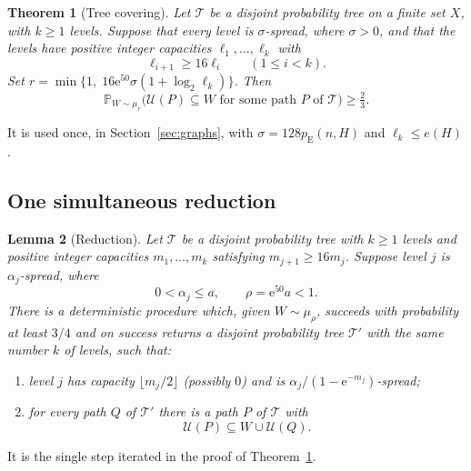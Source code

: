 \documentclass[11pt]{article}
\newtheorem{theorem}{Theorem}[section]
\newtheorem{lemma}[theorem]{Lemma}
\numberwithin{equation}{section}
\newcommand{\PP}{\mathbb P}
\newcommand{\pE}{p_{\mathrm E}}
\newcommand{\TT}{\mathcal T}
\newcommand{\UU}{\mathcal U}
\newcommand{\ee}{\mathrm e}
\begin{document}
\begin{theorem}[Tree covering]\label{thm:tree}
Let $\TT$ be a disjoint probability tree on a finite set $X$, with
$k\ge1$ levels. Suppose that every level is $\sigma$-spread, where
$\sigma>0$, and that the levels have positive integer capacities
$\ell_1,\ldots,\ell_k$ with
\[
 \ell_{i+1}\ge16\ell_i\qquad(1\le i<k).
\]
Set $r=\min\{1,\;16\ee^{50}\sigma(1+\log_2\ell_k)\}$. Then
\[
 \PP_{W\sim\mu_r}
 \bigl(\UU(P)\subseteq W\text{ for some path }P\text{ of }\TT\bigr)
 \ge\tfrac23.
\]
\end{theorem}

It is used once, in Section~\ref{sec:graphs}, with $\sigma=128\pE(n,H)$
and $\ell_k\le e(H)$.

\subsection{One simultaneous reduction}

\begin{lemma}[Reduction]\label{lem:reduction}
Let $\TT$ be a disjoint probability tree with $k\ge1$ levels and positive
integer capacities $m_1,\ldots,m_k$ satisfying $m_{j+1}\ge16m_j$. Suppose
level $j$ is $\alpha_j$-spread, where
\[
 0<\alpha_j\le a,\qquad\rho=\ee^{50}a<1.
\]
There is a deterministic procedure which, given $W\sim\mu_\rho$, succeeds
with probability at least $3/4$ and on success returns a disjoint
probability tree $\TT'$ with the same number $k$ of levels, such that:
\begin{enumerate}[label=(\roman*),leftmargin=2.2em,itemsep=2pt,topsep=3pt]
 \item level $j$ has capacity $\lfloor m_j/2\rfloor$ (possibly $0$) and
 is $\alpha_j/(1-\ee^{-m_j})$-spread;
 \item for every path $Q$ of $\TT'$ there is a path $P$ of $\TT$ with
 \begin{equation}\label{eq:recovery}
  \UU(P)\subseteq W\cup\UU(Q).
 \end{equation}
\end{enumerate}
\end{lemma}

It is the single step iterated in the proof of Theorem~\ref{thm:tree}.
\end{document}
